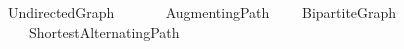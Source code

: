 %
\begin{isabellebody}%
%
%
\isadelimdocument
%
\endisadelimdocument
%
\isatagdocument
%
\isamarkuptrue%
%
\endisatagdocument
{\isafolddocument}%
%
\isadelimdocument
%
\endisadelimdocument
%
\isadelimtheory
%
\endisadelimtheory
%
\isatagtheory
{}\isamarkupfalse%
\ Undirected{\isacharunderscore}{\kern0pt}Graph\isanewline
\ \ \isanewline
\ \ \ \ Augmenting{\isacharunderscore}{\kern0pt}Path\isanewline
\ \ \ \ Bipartite{\isacharunderscore}{\kern0pt}Graph\isanewline
\ \ \ \ Shortest{\isacharunderscore}{\kern0pt}Alternating{\isacharunderscore}{\kern0pt}Path\isanewline
{}\isanewline
\isanewline
{}\isamarkupfalse%
%
\endisatagtheory
{\isafoldtheory}%
%
\isadelimtheory
%
\endisadelimtheory
%
\end{isabellebody}%
\endinput
